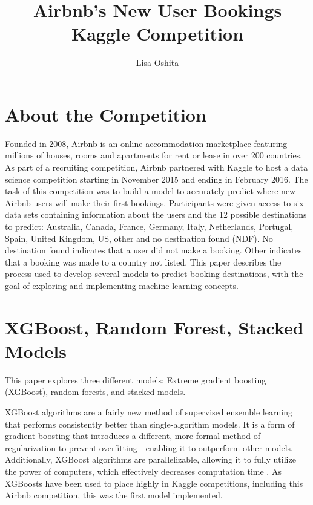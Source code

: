 \documentclass{article}
\title{Airbnb's New User Bookings Kaggle Competition}
\author{Lisa Oshita}
\begin{document}


\maketitle


\section{About the Competition}


Founded in 2008, Airbnb is an online accommodation marketplace featuring millions of houses, rooms and apartments for rent or lease in over 200 countries. As part of a recruiting competition, Airbnb partnered with Kaggle to host a data science competition starting in November 2015 and ending in February 2016. The task of this competition was to build a model to accurately predict where new Airbnb users will make their first bookings. Participants were given access to six data sets containing information about the users and the 12 possible destinations to predict: Australia, Canada, France, Germany, Italy, Netherlands, Portugal, Spain, United Kingdom, US, other and no destination found (NDF). No destination found indicates that a user did not make a booking. Other indicates that a booking was made to a country not listed. This paper describes the process used to develop several models to predict booking destinations, with the goal of exploring and implementing machine learning concepts.



\section{XGBoost, Random Forest, Stacked Models}

This paper explores three different models: Extreme gradient boosting (XGBoost), random forests, and stacked models. 

XGBoost algorithms are a fairly new method of supervised ensemble learning that performs consistently better than single-algorithm models. It is a form of gradient boosting that introduces a different, more formal method of regularization to prevent overfitting---enabling it to outperform other models. Additionally, XGBoost algorithms are parallelizable, allowing it to fully utilize the power of computers, which effectively decreases computation time \cite{xgb}. As XGBoosts have been used to place highly in Kaggle competitions, including this Airbnb competition, this was the first model implemented.
\end{document}
